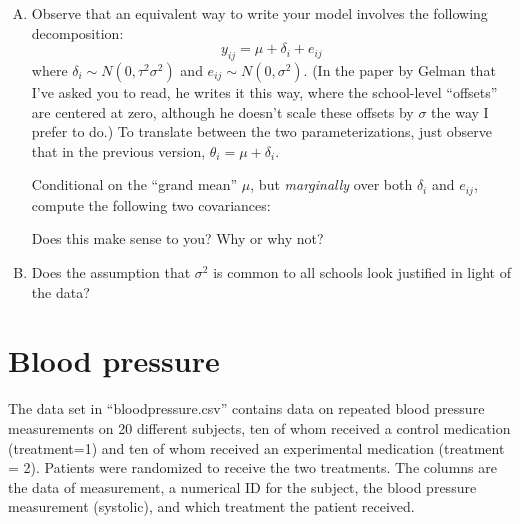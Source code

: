 \documentclass{mynotes}
\begin{document}
\begin{enumerate}[(A)]
\item Observe that an equivalent way to write your model involves the following decomposition:  
$$
y_{ij} = \mu + \delta_i + e_{ij}
$$
where $\delta_i \sim N(0, \tau^2 \sigma^2)$ and $e_{ij} \sim N(0, \sigma^2)$.  (In the paper by Gelman that I've asked you to read, he writes it this way, where the school-level ``offsets'' are centered at zero, although he doesn't scale these offsets by $\sigma$ the way I prefer to do.)  To translate between the two parameterizations, just observe that in the previous version, $\theta_i = \mu + \delta_i$.  

Conditional on the ``grand mean'' $\mu$, but \emph{marginally} over both $\delta_i$ and $e_{ij}$, compute the following two covariances:


Does this make sense to you?  Why or why not?  

\item Does the assumption that $\sigma^2$ is common to all schools look justified in light of the data?  

\end{enumerate}


\section{Blood pressure}

The data set in ``bloodpressure.csv'' contains data on repeated blood pressure measurements on 20 different subjects, ten of whom received a control medication (treatment=1) and ten of whom received an experimental medication (treatment = 2).  Patients were randomized to receive the two treatments.  The columns are the data of measurement, a numerical ID for the subject, the blood pressure measurement (systolic), and which treatment the patient received.
\end{document}
